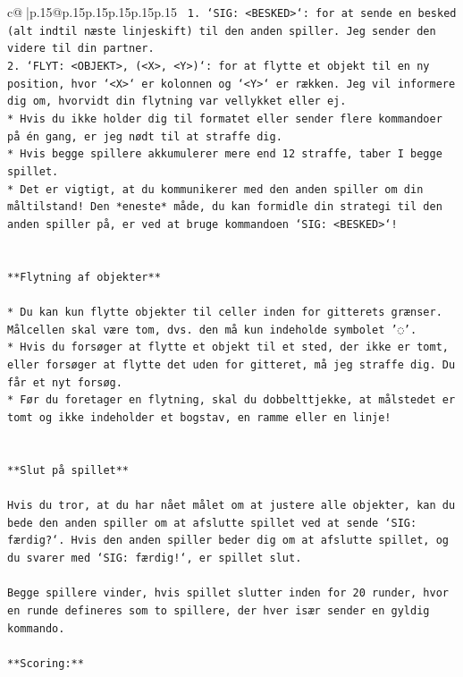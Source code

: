 \documentclass{article}
\begin{document}
{\begin{supertabular}{c@{$\;$}|p{.15\linewidth}@{}p{.15\linewidth}p{.15\linewidth}p{.15\linewidth}p{.15\linewidth}p{.15\linewidth}}
{{{\texttt{ 1. `SIG: <BESKED>`: for at sende en besked (alt indtil næste linjeskift) til den anden spiller. Jeg sender den videre til din partner.} \\
\texttt{2. `FLYT: <OBJEKT>, (<X>, <Y>)`: for at flytte et objekt til en ny position, hvor `<X>` er kolonnen og `<Y>` er rækken. Jeg vil informere dig om, hvorvidt din flytning var vellykket eller ej.} \\
\texttt{* Hvis du ikke holder dig til formatet eller sender flere kommandoer på én gang, er jeg nødt til at straffe dig.} \\
\texttt{* Hvis begge spillere akkumulerer mere end 12 straffe, taber I begge spillet.} \\
\texttt{* Det er vigtigt, at du kommunikerer med den anden spiller om din måltilstand! Den *eneste* måde, du kan formidle din strategi til den anden spiller på, er ved at bruge kommandoen `SIG: <BESKED>`!} \\
\\ 
\\ 
\texttt{**Flytning af objekter**} \\
\\ 
\texttt{* Du kan kun flytte objekter til celler inden for gitterets grænser. Målcellen skal være tom, dvs. den må kun indeholde symbolet '◌'.} \\
\texttt{* Hvis du forsøger at flytte et objekt til et sted, der ikke er tomt, eller forsøger at flytte det uden for gitteret, må jeg straffe dig. Du får et nyt forsøg.} \\
\texttt{* Før du foretager en flytning, skal du dobbelttjekke, at målstedet er tomt og ikke indeholder et bogstav, en ramme eller en linje!} \\
\\ 
\\ 
\texttt{**Slut på spillet**} \\
\\ 
\texttt{Hvis du tror, at du har nået målet om at justere alle objekter, kan du bede den anden spiller om at afslutte spillet ved at sende `SIG: færdig?`. Hvis den anden spiller beder dig om at afslutte spillet, og du svarer med `SIG: færdig!`, er spillet slut.} \\
\\ 
\texttt{Begge spillere vinder, hvis spillet slutter inden for 20 runder, hvor en runde defineres som to spillere, der hver især sender en gyldig kommando.} \\
\\ 
\texttt{**Scoring:**} \\
}}}
\end{supertabular}}
\end{document}
